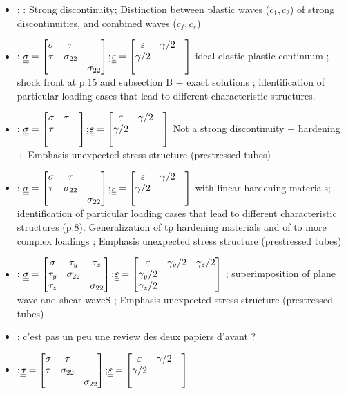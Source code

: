 \begin{itemize}
\item \cite{Rakhmatulin} ; \cite{CRISTESCU19591605} : Strong discontinuity; Distinction between plastic waves ($c_1,c_2$) of strong discontinuities, and combined waves ($c_f,c_s$)
\item \cite{Bleich}: ${\underline{\underline{\sigma}}}=\left[\begin{matrix}\sigma & \tau & \\ \tau & \sigma_{22} & \\ & & \sigma_{22}\end{matrix}\right]$;${\underline{\underline{\varepsilon}}}=\left[\begin{matrix}\varepsilon & \gamma/2 & \\ \gamma/2 &  & \\ & & \end{matrix}\right]$ ideal elastic-plastic continuum ; shock front at p.15 and subsection B + exact solutions ; identification of particular loading cases that lead to different characteristic structures.
\item \cite{Clifton}: ${\underline{\underline{\sigma}}}=\left[\begin{matrix}\sigma & \tau & \\ \tau & & \\ & & \end{matrix}\right]$;${\underline{\underline{\varepsilon}}}=\left[\begin{matrix}\varepsilon & \gamma/2 & \\ \gamma/2 &  & \\ & & \end{matrix}\right]$ Not a strong discontinuity + hardening + Emphasis unexpected stress structure (prestressed tubes)
\item \cite{Ting68}: ${\underline{\underline{\sigma}}}=\left[\begin{matrix}\sigma & \tau & \\ \tau & \sigma_{22} & \\ & & \sigma_{22}\end{matrix}\right]$;${\underline{\underline{\varepsilon}}}=\left[\begin{matrix}\varepsilon & \gamma/2 & \\ \gamma/2 &  & \\ & & \end{matrix}\right]$ with linear hardening materials; identification of particular loading cases that lead to different characteristic structures (p.8). Generalization of \cite{Bleich} tp hardening materials and of \cite{Clifton} to more complex loadings ; Emphasis unexpected stress structure (prestressed tubes)
\item \cite{Ting69}:  ${\underline{\underline{\sigma}}}=\left[\begin{matrix}\sigma & \tau_y & \tau_z\\ \tau_y & \sigma_{22} & \\\tau_z & & \sigma_{22}\end{matrix}\right]$;${\underline{\underline{\varepsilon}}}=\left[\begin{matrix}\varepsilon & \gamma_y/2 & \gamma_z/2\\ \gamma_y/2 &  & \\ \gamma_z/2& & \end{matrix}\right]$ ; superimposition of plane wave and shear waveS ; Emphasis unexpected stress structure (prestressed tubes)
\item \cite{Ting73}: c'est pas un peu une review des deux papiers d'avant ?
\item \cite{Li_planeStress_EP}:${\underline{\underline{\sigma}}}=\left[\begin{matrix}\sigma & \tau & \\ \tau & \sigma_{22} & \\ & & \sigma_{22}\end{matrix}\right]$;${\underline{\underline{\varepsilon}}}=\left[\begin{matrix}\varepsilon & \gamma/2 & \\ \gamma/2 &  & \\ & & \end{matrix}\right]$
\end{itemize}

